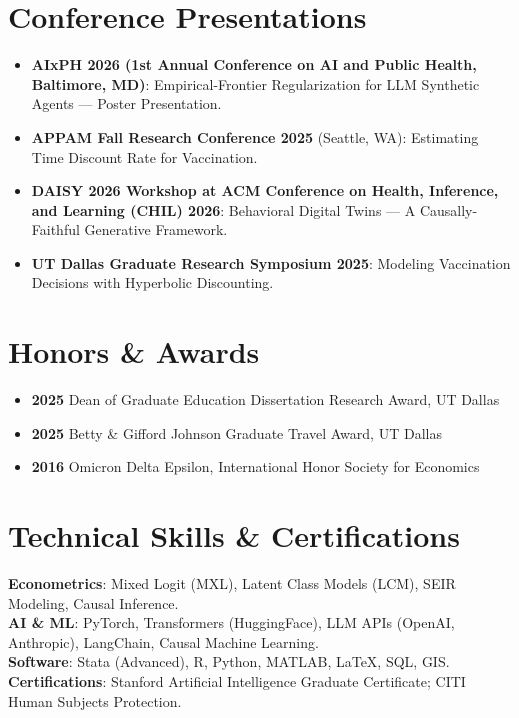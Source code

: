\documentclass[11pt, letterpaper]{article}
\begin{document}
\section*{Conference Presentations}
\begin{itemize}[noitemsep, topsep=0pt]
    \item \textbf{AIxPH 2026 (1st Annual Conference on AI and Public Health, Baltimore, MD)}: Empirical-Frontier Regularization for LLM Synthetic Agents — Poster Presentation.
    \item \textbf{APPAM Fall Research Conference 2025} (Seattle, WA): Estimating Time Discount Rate for Vaccination.
    \item \textbf{DAISY 2026 Workshop at ACM Conference on Health, Inference, and Learning (CHIL) 2026}: Behavioral Digital Twins — A Causally-Faithful Generative Framework.
    \item \textbf{UT Dallas Graduate Research Symposium 2025}: Modeling Vaccination Decisions with Hyperbolic Discounting.
\end{itemize}

\section*{Honors \& Awards}
\begin{itemize}[noitemsep, topsep=0pt]
    \item \textbf{2025} Dean of Graduate Education Dissertation Research Award, UT Dallas
    \item \textbf{2025} Betty \& Gifford Johnson Graduate Travel Award, UT Dallas
    \item \textbf{2016} Omicron Delta Epsilon, International Honor Society for Economics
\end{itemize}

\section*{Technical Skills \& Certifications}
\textbf{Econometrics}: Mixed Logit (MXL), Latent Class Models (LCM), SEIR Modeling, Causal Inference. \\
\textbf{AI \& ML}: PyTorch, Transformers (HuggingFace), LLM APIs (OpenAI, Anthropic), LangChain, Causal Machine Learning. \\
\textbf{Software}: Stata (Advanced), R, Python, MATLAB, LaTeX, SQL, GIS. \\
\textbf{Certifications}: Stanford Artificial Intelligence Graduate Certificate; CITI Human Subjects Protection.
\end{document}
